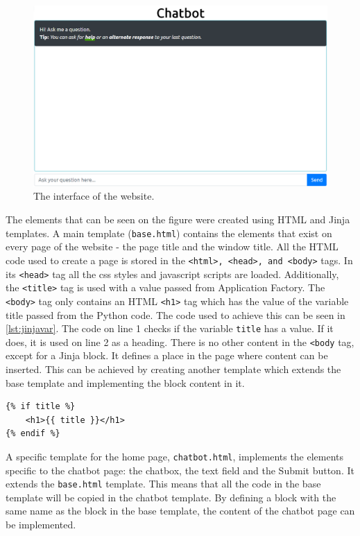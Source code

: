 \documentclass[12pt,a4paper]{article}
\newcommand{\captionstyle}[1] {
    \small{#1}
}
\begin{document}
\begin{figure}[!htb]%
    \centering
    \includegraphics[width=1.0\columnwidth]{app-interface}%
    \caption{\captionstyle{The interface of the website.}}%
    \label{fig:site-interface}%
\end{figure}

The elements that can be seen on the figure were created using HTML and Jinja templates. A main template (\texttt{base.html}) contains the elements that exist on every page of the website - the page title and the window title. All the HTML code used to create a page is stored in the \texttt{<html>, <head>, and <body>} tags. In its \texttt{<head>} tag all the css styles and javascript scripts are loaded. Additionally, the \texttt{<title>} tag is used with a value passed from Application Factory. The \texttt{<body>} tag only contains an HTML \texttt{<h1>} tag which has the value of the variable title passed from the Python code. The code used to achieve this can be seen in \cref{lst:jinjavar}. The code on line 1 checks if the variable \texttt{title} has a value. If it does, it is used on line 2 as a heading. There is no other content in the \texttt{<body} tag, except for a Jinja block. It defines a place in the page where content can be inserted. This can be achieved by creating another template which extends the base template and implementing the block content in it.

\begin{lstlisting}[caption={\captionstyle{Using a variable passed from Python in a Jinja template.}}, label={lst:jinjavar}]
{% if title %}
    <h1>{{ title }}</h1>
{% endif %}
\end{lstlisting}

A specific template for the home page, \texttt{chatbot.html}, implements the elements specific to the chatbot page: the chatbox, the text field and the Submit button. It extends the \texttt{base.html} template. This means that all the code in the base template will be copied in the chatbot template. By defining a block with the same name as the block in the base template, the content of the chatbot page can be implemented.
\end{document}
